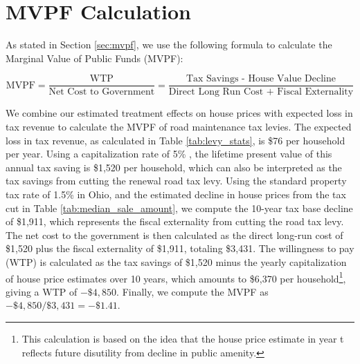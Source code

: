 \clearpage


















































\section{MVPF Calculation} \label{sec:appxmvpf}

As stated in Section \ref{sec:mvpf}, we use the following formula to calculate the Marginal Value of Public Funds (MVPF):

\begin{equation}
    \text{MVPF} = \frac{\text{WTP}}{\text{Net Cost to Government}} = \frac{\text{Tax Savings - House Value Decline}}{\text{Direct Long Run Cost + Fiscal Externality}}
\end{equation}

We combine our estimated treatment effects on house prices with expected loss in tax revenue to calculate the MVPF of road maintenance tax levies. The expected loss in tax revenue, as calculated in Table \ref{tab:levy_stats}, is \$76 per household per year. Using a capitalization rate of 5\% \citep{hilber2011economic, cellini2010value}, the lifetime present value of this annual tax saving is \$1,520 per household, which can also be interpreted as the tax savings from cutting the renewal road tax levy. Using the standard property tax rate of 1.5\% in Ohio, and the estimated decline in house prices from the tax cut in Table \ref{tab:median_sale_amount}, we compute the 10-year tax base decline of \$1,911, which represents the fiscal externality from cutting the road tax levy. The net cost to the government is then calculated as the direct long-run cost of \$1,520 plus the fiscal externality of \$1,911, totaling \$3,431. The willingness to pay (WTP) is calculated as the tax savings of \$1,520 minus the yearly capitalization of house price estimates over 10 years, which amounts to \$6,370 per household\footnote{This calculation is based on the idea that the house price estimate in year t reflects future disutility from decline in public amenity.}, giving a WTP of \(-\$4,850\). Finally, we compute the MVPF as \(-\$4,850 / \$3,431 = -\$1.41\).


